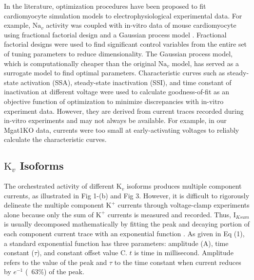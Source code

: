 \documentclass[10pt,letterpaper]{article}
\begin{document}
In the literature, optimization procedures have been proposed to fit cardiomyocyte simulation models to electrophysiological experimental data. For example, $\text{Na}_{v}$ activity was coupled with in-vitro data of mouse cardiomyocyte using fractional factorial design and a Gaussian process model \cite{du2015statistical}. Fractional factorial designs were used to find significant control variables from the entire set of tuning parameters to reduce dimensionality. The Gaussian process model, which is computationally cheaper than the original $\text{Na}_{v}$ model, has served as a surrogate model to find optimal parameters. Characteristic curves such as steady-state activation (SSA), steady-state inactivation (SSI), and time constant of inactivation at different voltage were used to calculate goodness-of-fit as an objective function of optimization to minimize discrepancies with in-vitro experiment data. However, they are derived from current traces recorded during in-vitro experiments and may not always be available. For example, in our Mgat1KO data, currents were too small at early-activating voltages to reliably calculate the characteristic curves.  

\subsection*{$\text{K}_{v}$ Isoforms}
The orchestrated activity of different $\text{K}_{v}$ isoforms produces multiple component currents, as illustrated in Fig 1-(b) and Fig 3. However, it is difficult to rigorously delineate the multiple component $\text{K}^{+}$ currents through voltage-clamp experiments alone because only the sum of $\text{K}^{+}$ currents is measured and recorded. Thus, $\text{I}_{Ksum}$ is usually decomposed mathematically by fitting the peak and decaying portion of each component current trace with an exponential function \cite{brunet2004heterogeneous}. As given in Eq (1), a standard exponential function has three parameters: amplitude ($\text{A}$), time constant ($\tau$), and constant offset value $\text{C}$. $t$ is time in millisecond. Amplitude refers to the value of the peak and $\tau$ to the time constant when current reduces by $e^{-1}$ (~63\%) of the peak. 
\end{document}
